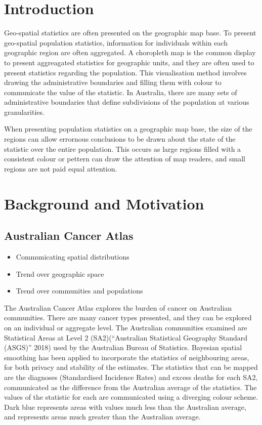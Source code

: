 \documentclass[conference,final,]{IEEEtran}
\providecommand{\tightlist}{%
  \setlength{\itemsep}{0pt}\setlength{\parskip}{0pt}}
\begin{document}
\hypertarget{introduction}{%
\section{Introduction}\label{introduction}}

Geo-spatial statistics are often presented on the geographic map base.
To present geo-spatial population statistics, information for
individuals within each geographic region are often aggregated. A
choropleth map is the common display to present aggreagated statistics
for geographic units, and they are often used to present statistics
regarding the population. This visualisation method involves drawing the
administrative boundaries and filling them with colour to communicate
the value of the statistic. In Australia, there are many sets of
administrative boundaries that define subdivisions of the population at
various granularities.

When presenting population statistics on a geographic map base, the size
of the regions can allow errornous conclusions to be drawn about the
state of the statistic over the entire population. This occurs as large
regions filled with a consistent colour or pettern can draw the
attention of map readers, and small regions are not paid equal
attention.

\hypertarget{background-and-motivation}{%
\section{Background and Motivation}\label{background-and-motivation}}

\hypertarget{australian-cancer-atlas}{%
\subsection{Australian Cancer Atlas}\label{australian-cancer-atlas}}

\begin{itemize}
\tightlist
\item
  Communicating spatial distributions
\item
  Trend over geographic space
\item
  Trend over communities and populations
\end{itemize}

The Australian Cancer Atlas explores the burden of cancer on Australian
communities. There are many cancer types presented, and they can be
explored on an individual or aggregate level. The Australian communities
examined are Statistical Areas at Level 2 (SA2)(``Australian Statistical
Geography Standard (ASGS)'' 2018) used by the Australian Bureau of
Statistics. Bayesian spatial smoothing has been applied to incorporate
the statistics of neighbouring areas, for both privacy and stability of
the estimates. The statistics that can be mapped are the diagnoses
(Standardised Incidence Rates) and excess deaths for each SA2,
communicated as the difference from the Australian average of the
statistics. The values of the statistic for each are communicated using
a diverging colour scheme. Dark blue represents areas with values much
less than the Australian average, and represents areas much greater than
the Australian average.
\end{document}
